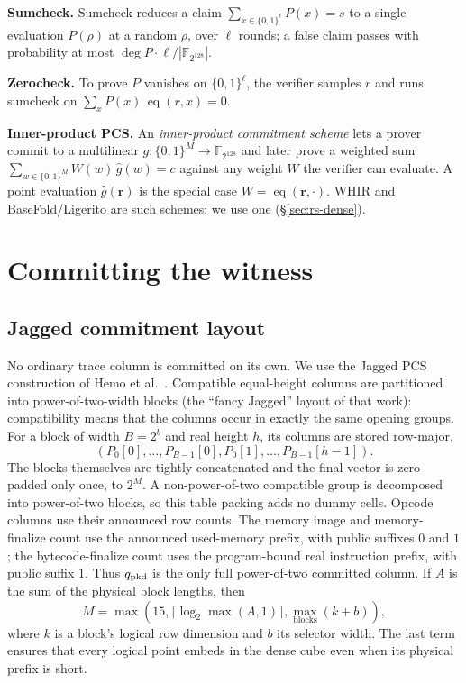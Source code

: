 \documentclass[11pt]{article}
\newcommand{\F}{\mathbb{F}}
\newcommand{\eq}{\operatorname{eq}}
\newcommand{\cube}[1]{\{0,1\}^{#1}}
\begin{document}
\textbf{Sumcheck.} Sumcheck reduces a claim $\sum_{x\in\cube\ell}P(x)=s$ to a single evaluation $P(\rho)$ at a random $\rho$, over $\ell$ rounds; a false claim passes with probability at most $\deg P\cdot\ell/|\F_{2^{128}}|$.

\textbf{Zerocheck.} To prove $P$ vanishes on $\cube\ell$, the verifier samples $r$ and runs sumcheck on $\sum_{x}P(x)\,\eq(r,x)=0$.

\textbf{Inner-product PCS.} An \emph{inner-product commitment scheme} lets a prover commit to a multilinear $g:\cube{M}\to\F_{2^{128}}$ and later prove a weighted sum $\sum_{w\in\cube M} W(w)\,\widehat g(w)=c$ against any weight $W$ the verifier can evaluate. A point evaluation $\widehat g(\mathbf r)$ is the special case $W=\eq(\mathbf r,\cdot)$. WHIR and BaseFold/Ligerito are such schemes; we use one (\S\ref{sec:rs-dense}).

\section{Committing the witness}\label{sec:rs}

\subsection{Jagged commitment layout}\label{sec:stacking}

No ordinary trace column is committed on its own.  We use the Jagged PCS construction of Hemo et al.~\cite{jagged-pcs}.  Compatible equal-height columns are partitioned into power-of-two-width blocks (the ``fancy Jagged'' layout of that work): compatibility means that the columns occur in exactly the same opening groups.  For a block of width $B=2^b$ and real height $h$, its columns are stored row-major,
\[
  (P_0[0],\ldots,P_{B-1}[0],P_0[1],\ldots,P_{B-1}[h-1]).
\]
The blocks themselves are tightly concatenated and the final vector is zero-padded only once, to $2^M$.  A non-power-of-two compatible group is decomposed into power-of-two blocks, so this table packing adds no dummy cells.  Opcode columns use their announced row counts.  The memory image and memory-finalize count use the announced used-memory prefix, with public suffixes $0$ and $1$; the bytecode-finalize count uses the program-bound real instruction prefix, with public suffix $1$.  Thus $q_{\rm pkd}$ is the only full power-of-two committed column.  If $A$ is the sum of the physical block lengths, then
\[
  M=\max\!\left(15,\lceil\log_2\max(A,1)\rceil,
                    \max_{\text{blocks}}(k+b)\right),
\]
where $k$ is a block's logical row dimension and $b$ its selector width.  The last term ensures that every logical point embeds in the dense cube even when its physical prefix is short.
\end{document}
